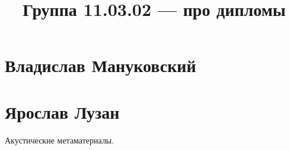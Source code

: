 \documentclass{article}
\title{Группа 11.03.02 --- про дипломы}
\begin{document}
\section*{Владислав Мануковский}
\section*{Ярослав Лузан}
Акустические метаматериалы.
\end{document}

